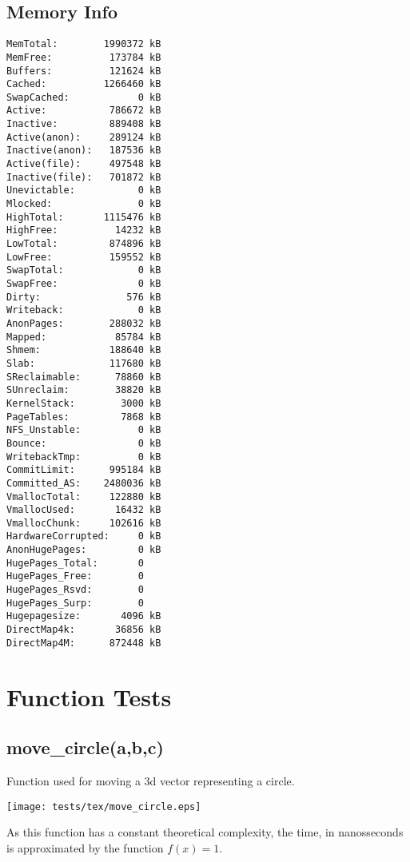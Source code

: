 \documentclass{article}
\begin{document}
\subsection{Memory Info}
\begin{verbatim}
MemTotal:        1990372 kB
MemFree:          173784 kB
Buffers:          121624 kB
Cached:          1266460 kB
SwapCached:            0 kB
Active:           786672 kB
Inactive:         889408 kB
Active(anon):     289124 kB
Inactive(anon):   187536 kB
Active(file):     497548 kB
Inactive(file):   701872 kB
Unevictable:           0 kB
Mlocked:               0 kB
HighTotal:       1115476 kB
HighFree:          14232 kB
LowTotal:         874896 kB
LowFree:          159552 kB
SwapTotal:             0 kB
SwapFree:              0 kB
Dirty:               576 kB
Writeback:             0 kB
AnonPages:        288032 kB
Mapped:            85784 kB
Shmem:            188640 kB
Slab:             117680 kB
SReclaimable:      78860 kB
SUnreclaim:        38820 kB
KernelStack:        3000 kB
PageTables:         7868 kB
NFS_Unstable:          0 kB
Bounce:                0 kB
WritebackTmp:          0 kB
CommitLimit:      995184 kB
Committed_AS:    2480036 kB
VmallocTotal:     122880 kB
VmallocUsed:       16432 kB
VmallocChunk:     102616 kB
HardwareCorrupted:     0 kB
AnonHugePages:         0 kB
HugePages_Total:       0
HugePages_Free:        0
HugePages_Rsvd:        0
HugePages_Surp:        0
Hugepagesize:       4096 kB
DirectMap4k:       36856 kB
DirectMap4M:      872448 kB
\end{verbatim}
\section{Function Tests}
\subsection{move\_circle(a,b,c)}
Function used for moving a 3d vector representing a circle.


\texttt{[image: tests/tex/move\_circle.eps]}

As this function has a constant theoretical
complexity, the time, in nanosseconds is 
approximated by the function $f(x)=1$.
\end{document}
